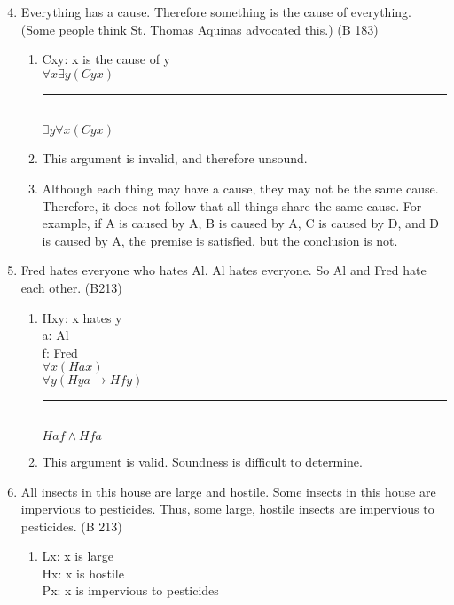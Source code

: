 \documentclass{article}
\begin{document}
\begin{enumerate}
      \setcounter{enumi}{3}
      \item Everything has a cause. Therefore something is the cause of everything. (Some people think St. Thomas Aquinas advocated this.) (B 183)
            \begin{enumerate}
                  \item Cxy: x is the cause of y\\

                        $\forall x \exists y(Cyx)$\\
                        \rule{15em}{.5pt}\\
                        $\exists y \forall x(Cyx)$
                  \item This argument is invalid, and therefore unsound.
                  \item Although each thing may have a cause, they may not be the same cause. Therefore, it does not follow that all things share the same cause. For example, if A is caused by A, B is caused by A, C is caused by D, and D is caused by A, the premise is satisfied, but the conclusion is not.
            \end{enumerate}
      \item Fred hates everyone who hates Al. Al hates everyone. So Al and Fred hate each other. (B213)
            \begin{enumerate}
                  \item Hxy: x hates y\\
                        a: Al\\
                        f: Fred\\

                        $\forall x(Hax)$\\
                        $\forall y(Hya \to Hfy)$\\
                        \rule{15em}{.5pt}\\
                        $Haf \land Hfa$
                  \item This argument is valid. Soundness is difficult to determine.
            \end{enumerate}
      \item All insects in this house are large and hostile. Some insects in this house are impervious to pesticides. Thus, some large, hostile insects are impervious to pesticides. (B 213)
            \begin{enumerate}
                  \item Lx: x is large\\
                        Hx: x is hostile\\
                        Px: x is impervious to pesticides\\


\end{enumerate}
\end{enumerate}
\end{document}
